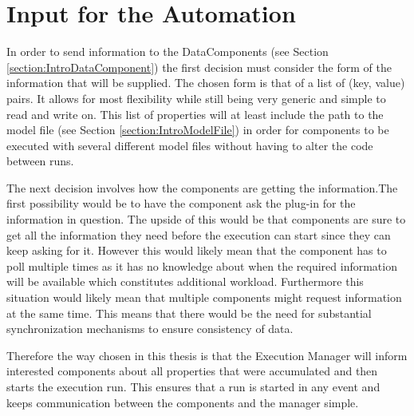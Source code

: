 \section{Input for the Automation}
\label{section:AutoConceptsInput}
In order to send information to the DataComponents (see Section \ref{section:IntroDataComponent})
the first decision must consider the form of the information that will be supplied.
The chosen form is that of a list of (key, value) pairs. It allows for most
flexibility while still being very generic and simple to read and write on.
This list of properties will at least include the path to the model file (see Section \ref{section:IntroModelFile}) in order
for components to be executed with several different model files without having
to alter the code between runs.

The next decision involves how the components are getting the information.The first possibility 
would be to have the component ask the plug-in for the information
in question. The upside of this would be that components are sure to get all the information
they need before the execution can start since they can keep asking for it. However this would
likely mean that the component has to poll multiple times as it has no knowledge about when
the required information will be available which constitutes additional workload. Furthermore
this situation would likely mean that multiple components might request information
at the same time. This means that there would be the need for substantial synchronization mechanisms
to ensure consistency of data.

Therefore the way chosen in this thesis is that the Execution Manager will inform interested components
about all properties that were accumulated and then starts the execution run. This ensures
that a run is started in any event and keeps communication between the components and the manager simple.


